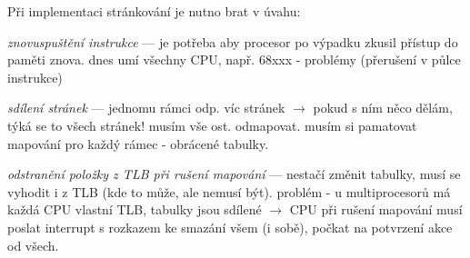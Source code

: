 Při implementaci stránkování je nutno brat v úvahu: 
\begin{pitemize}
    \item \emph{znovuspuštění instrukce} --- je potřeba aby procesor po výpadku zkusil přístup do paměti znova. dnes umí všechny CPU, např. 68xxx - problémy (přerušení v půlce instrukce) 
    \item \emph{sdílení stránek} --- jednomu rámci odp. víc stránek $\rightarrow$ pokud s ním něco dělám, týká se to všech stránek!  musím vše ost. odmapovat. musím si pamatovat mapování pro každý rámec - obrácené tabulky. 
    \item \emph{odstranění položky z TLB při rušení mapování} --- nestačí změnit tabulky, musí se vyhodit i z TLB (kde to může, ale nemusí být). problém - u multiprocesorů má každá CPU vlastní TLB, tabulky jsou sdílené $\rightarrow$ CPU při rušení mapování musí poslat interrupt s rozkazem ke smazání všem (i sobě), počkat na potvrzení akce od všech.
\end{pitemize}

